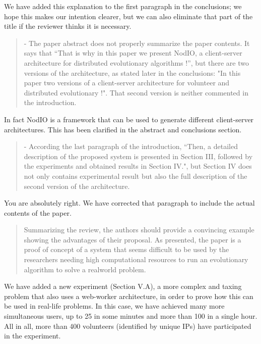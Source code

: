 \documentclass[preprint]{elsarticle}
\begin{document}
We have added this explanation to the first paragraph in the
conclusions; we hope this makes our intention clearer, but we can also
eliminate that part of the title if the reviewer thinks it is
necessary.

\begin{quote}
- The paper abstract does not properly summarize the paper contents. It says that ``That is why in this
paper we present NodIO, a client-server architecture for distributed evolutionary algorithms !'', but there
are two versions of the architecture, as stated later in the conclusions: "In this paper two versions of a
client-server architecture for volunteer and distributed evolutionary !". That second version is neither
commented in the introduction.
\end{quote}

In fact {\sf NodIO} is a framework that can be used to generate
different client-server architectures. This has been clarified in the
abstract and conclusions section. 

\begin{quote}
- According the last paragraph of the introduction, ``Then, a detailed description of the proposed system is
presented in Section III, followed by the experiments and obtained results in Section IV.", but Section IV
does not only contains experimental result but also the full description of the second version of the
architecture.
\end{quote}

You are absolutely right. We have corrected that paragraph to include
the actual contents of the paper. 

\begin{quote}
Summarizing the review, the authors should provide a convincing example showing the advantages of
their proposal. As presented, the paper is a proof of concept of a system that seems difficult to be used
by the researchers needing high computational resources to run an evolutionary algorithm to solve a realworld
problem.
\end{quote}


We have added a new experiment (Section V.A), a more complex and
taxing problem that also uses a web-worker architecture, in order to
prove how this can be 
used in real-life problems. In this case, we have achieved many more
simultaneous users, up to 25 in some minutes and more than 100 in a
single hour. All in all, more than 400 volunteers (identified by
unique IPs) have participated in
the experiment. 
\end{document}
